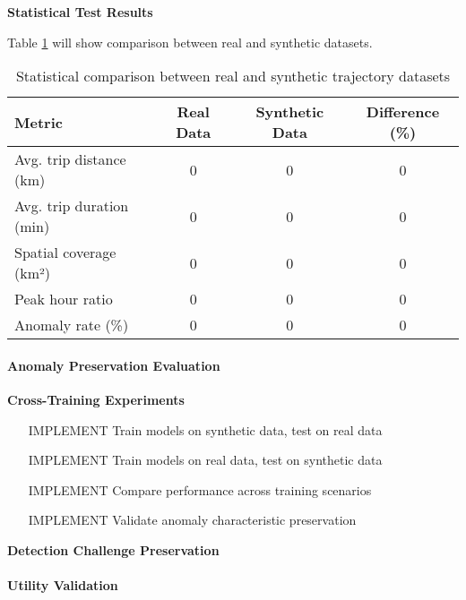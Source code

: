 \documentclass[runningheads]{llncs}
\begin{document}
\textbf{Statistical Test Results}

Table \ref{tab:synthetic-stats} will show comparison between real and synthetic datasets.

\begin{table}[h]
\centering
\begin{tabular}{l|c|c|c}
\textbf{Metric} & \textbf{Real Data} & \textbf{Synthetic Data} & \textbf{Difference (\%)} \\ \hline
Avg. trip distance (km) & 0 & 0 & 0 \\
Avg. trip duration (min) & 0 & 0 & 0 \\
Spatial coverage (km²) & 0 & 0 & 0 \\
Peak hour ratio & 0 & 0 & 0 \\
Anomaly rate (\%) & 0 & 0 & 0 \\
\end{tabular}
\caption{Statistical comparison between real and synthetic trajectory datasets}
\label{tab:synthetic-stats}
\end{table}

\paragraph{Anomaly Preservation Evaluation}

\textbf{Cross-Training Experiments}
\begin{enumerate}
\item [IMPLEMENT] Train models on synthetic data, test on real data
\item [IMPLEMENT] Train models on real data, test on synthetic data
\item [IMPLEMENT] Compare performance across training scenarios
\item [IMPLEMENT] Validate anomaly characteristic preservation
\end{enumerate}

\textbf{Detection Challenge Preservation}

\paragraph{Utility Validation}
\end{document}
